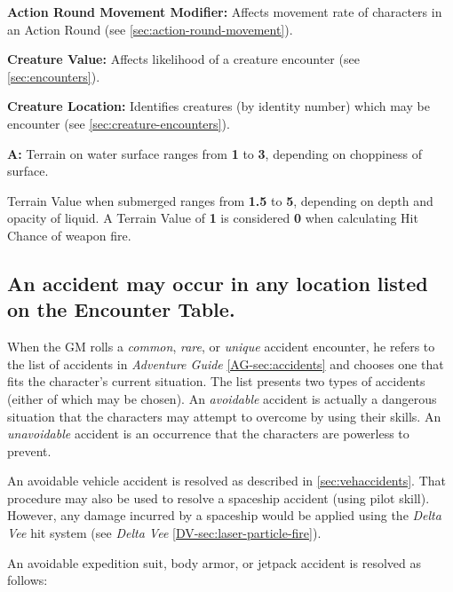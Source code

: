 \begin{table}[htbp]
{\begin{minipage}{0.95\textwidth}
{        \textbf{Action Round Movement Modifier:} Affects movement rate
        of characters in an Action Round (see \ref{sec:action-round-movement}).
        
        \textbf{Creature Value:} Affects likelihood of a creature
        encounter (see \ref{sec:encounters}).
        
        \textbf{Creature Location:} Identifies creatures (by identity
        number) which may be encounter (see \ref{sec:creature-encounters}).
        
        \textbf{A:} Terrain on water surface ranges from \textbf{1} to
        \textbf{3}, depending on choppiness of surface.
        
        Terrain Value when submerged ranges from \textbf{1.5} to
        \textbf{5}, depending on depth and opacity of liquid. A
        Terrain Value of \textbf{1} is considered \textbf{0} when
        calculating Hit Chance of weapon fire.}
    \end{minipage}}
\end{table}


\subsection[Accidents]{An accident may occur in any location listed on the
        Encounter Table.}
\label{sec:accidents}


When the GM rolls a \emph{common}, \emph{rare}, or \emph{unique}
accident encounter, he refers to the list of accidents in
\emph{Adventure Guide} \ref{AG-sec:accidents} and chooses one that
fits the character's current 
situation. The list presents two types of accidents (either of which
may be chosen). An \emph{avoidable} accident is actually a dangerous
situation that the characters may attempt to overcome by using their
skills. An \emph{unavoidable} accident is an occurrence that the
characters are powerless to prevent.

An avoidable vehicle accident is resolved as described in
\ref{sec:vehaccidents}. That procedure may also be used to resolve a
spaceship accident (using pilot skill). However, any damage incurred
by a spaceship would be applied using the \emph{Delta Vee} hit system
(see \emph{Delta Vee} \ref{DV-sec:laser-particle-fire}).

An avoidable expedition suit, body armor, or jetpack accident is
resolved as follows:

